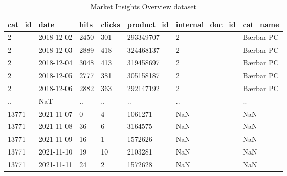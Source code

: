 \begin{table}[htbp]
\centering
\caption{Market Insights Overview dataset}
\label{table:market_insights_overview_11-12-21}
\begin{tabular}{lllllll}
\toprule
cat\_id &       date & hits & clicks & product\_id & internal\_doc\_id &  cat\_name \\
\midrule
     2 & 2018-12-02 & 2450 &    301 &  293349707 &               2 & Bærbar PC \\
     2 & 2018-12-03 & 2889 &    418 &  324468137 &               2 & Bærbar PC \\
     2 & 2018-12-04 & 3048 &    413 &  319458697 &               2 & Bærbar PC \\
     2 & 2018-12-05 & 2777 &    381 &  305158187 &               2 & Bærbar PC \\
     2 & 2018-12-06 & 2882 &    363 &  292147192 &               2 & Bærbar PC \\
    .. &        NaT &   .. &     .. &         .. &              .. &        .. \\
 13771 & 2021-11-07 &    0 &      4 &    1061271 &             NaN &       NaN \\
 13771 & 2021-11-08 &   36 &      6 &    3164575 &             NaN &       NaN \\
 13771 & 2021-11-09 &   16 &      1 &    1572626 &             NaN &       NaN \\
 13771 & 2021-11-10 &   19 &     10 &    2103281 &             NaN &       NaN \\
 13771 & 2021-11-11 &   24 &      2 &    1572628 &             NaN &       NaN \\
\bottomrule
\end{tabular}
\end{table}
